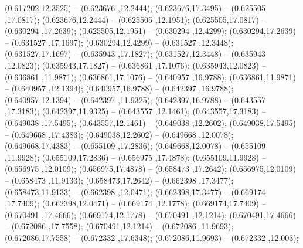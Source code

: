  (0.617202,12.3525) -- (0.623676 ,12.2444);
 (0.623676,17.3495) -- (0.625505 ,17.0817);
 (0.623676,12.2444) -- (0.625505 ,12.1951);
 (0.625505,17.0817) -- (0.630294 ,17.2639);
 (0.625505,12.1951) -- (0.630294 ,12.4299);
 (0.630294,17.2639) -- (0.631527 ,17.1697);
 (0.630294,12.4299) -- (0.631527 ,12.3448);
 (0.631527,17.1697) -- (0.635943 ,17.1827);
 (0.631527,12.3448) -- (0.635943 ,12.0823);
 (0.635943,17.1827) -- (0.636861 ,17.1076);
 (0.635943,12.0823) -- (0.636861 ,11.9871);
 (0.636861,17.1076) -- (0.640957 ,16.9788);
 (0.636861,11.9871) -- (0.640957 ,12.1394);
 (0.640957,16.9788) -- (0.642397 ,16.9788);
 (0.640957,12.1394) -- (0.642397 ,11.9325);
 (0.642397,16.9788) -- (0.643557 ,17.3183);
 (0.642397,11.9325) -- (0.643557 ,12.1461);
 (0.643557,17.3183) -- (0.649038 ,17.5495);
 (0.643557,12.1461) -- (0.649038 ,12.2602);
 (0.649038,17.5495) -- (0.649668 ,17.4383);
 (0.649038,12.2602) -- (0.649668 ,12.0078);
 (0.649668,17.4383) -- (0.655109 ,17.2836);
 (0.649668,12.0078) -- (0.655109 ,11.9928);
 (0.655109,17.2836) -- (0.656975 ,17.4878);
 (0.655109,11.9928) -- (0.656975 ,12.0109);
 (0.656975,17.4878) -- (0.658473 ,17.2642);
 (0.656975,12.0109) -- (0.658473 ,11.9133);
 (0.658473,17.2642) -- (0.662398 ,17.3477);
 (0.658473,11.9133) -- (0.662398 ,12.0471);
 (0.662398,17.3477) -- (0.669174 ,17.7409);
 (0.662398,12.0471) -- (0.669174 ,12.1778);
 (0.669174,17.7409) -- (0.670491 ,17.4666);
 (0.669174,12.1778) -- (0.670491 ,12.1214);
 (0.670491,17.4666) -- (0.672086 ,17.7558);
 (0.670491,12.1214) -- (0.672086 ,11.9693);
 (0.672086,17.7558) -- (0.672332 ,17.6348);
 (0.672086,11.9693) -- (0.672332 ,12.003);

